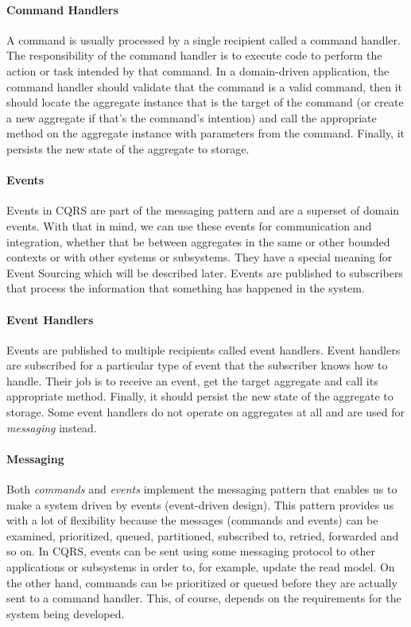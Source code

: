 \documentclass{book}
\begin{document}
\paragraph{Command Handlers}\label{command-handlers}

A command is usually processed by a single recipient called a command
handler. The responsibility of the command handler is to execute code to
perform the action or task intended by that command. In a domain-driven
application, the command handler should validate that the command is a
valid command, then it should locate the aggregate instance that is the
target of the command (or create a new aggregate if that's the command's
intention) and call the appropriate method on the aggregate instance
with parameters from the command. Finally, it persists the new state of
the aggregate to storage.

\paragraph{Events}\label{events}

Events in CQRS are part of the messaging pattern and are a superset of
domain events. With that in mind, we can use these events for
communication and integration, whether that be between aggregates in the
same or other bounded contexts or with other systems or subsystems. They
have a special meaning for Event Sourcing which will be described later.
Events are published to subscribers that process the information that
something has happened in the system.

\paragraph{Event Handlers}\label{event-handlers}

Events are published to multiple recipients called event handlers. Event
handlers are subscribed for a particular type of event that the
subscriber knows how to handle. Their job is to receive an event, get
the target aggregate and call its appropriate method. Finally, it should
persist the new state of the aggregate to storage. Some event handlers
do not operate on aggregates at all and are used for \emph{messaging}
instead.

\paragraph{Messaging}\label{messaging}

Both \emph{commands} and \emph{events} implement the messaging pattern
that enables us to make a system driven by events (event-driven design).
This pattern provides us with a lot of flexibility because the messages
(commands and events) can be examined, prioritized, queued, partitioned,
subscribed to, retried, forwarded and so on. In CQRS, events can be sent
using some messaging protocol to other applications or subsystems in
order to, for example, update the read model. On the other hand,
commands can be prioritized or queued before they are actually sent to a
command handler. This, of course, depends on the requirements for the
system being developed.
\end{document}
